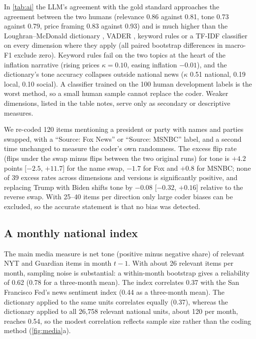 \documentclass[11pt]{article}
\begin{document}
In \cref{tab:ai} the LLM's agreement with the gold standard approaches the agreement between the two humans (relevance 0.86 against 0.81, tone 0.73 against 0.79, price framing 0.83 against 0.93) and is much higher than the Loughran–McDonald dictionary \citep{loughran2011}, VADER \citep{hutto2014}, keyword rules or a TF-IDF classifier on every dimension where they apply (all paired bootstrap differences in macro-F1 exclude zero). Keyword rules fail on the two topics at the heart of the inflation narrative (rising prices $\kappa = 0.10$, easing inflation $-0.01$), and the dictionary's tone accuracy collapses outside national news ($\kappa$ 0.51 national, 0.19 local, 0.10 social). A classifier trained on the 100 human development labels is the worst method, so a small human sample cannot replace the coder. Weaker dimensions, listed in the table notes, serve only as secondary or descriptive measures.



 We re-coded 120 items mentioning a president or party with names and parties swapped, with a ``Source: Fox News'' or ``Source: MSNBC'' label, and a second time unchanged to measure the coder's own randomness. The excess flip rate (flips under the swap minus flips between the two original runs) for tone is $+4.2$ points [$-2.5$, $+11.7$] for the name swap, $-1.7$ for Fox and $+0.8$ for MSNBC; none of 39 excess rates across dimensions and versions is significantly positive, and replacing Trump with Biden shifts tone by $-0.08$ [$-0.32$, $+0.16$] relative to the reverse swap. With 25–40 items per direction only large coder biases can be excluded, so the accurate statement is that no bias was detected.

\subsection{A monthly national index}
The main media measure is net tone (positive minus negative share) of relevant NYT and Guardian items in month $t-1$. With about 26 relevant items per month, sampling noise is substantial: a within-month bootstrap gives a reliability of 0.62 (0.78 for a three-month mean). The index correlates 0.37 with the San Francisco Fed's news sentiment index \citep{shapiro2022} (0.44 as a three-month mean). The dictionary applied to the same units correlates equally (0.37), whereas the dictionary applied to all 26,758 relevant national units, about 120 per month, reaches 0.54, so the modest correlation reflects sample size rather than the coding method (\cref{fig:media}a).
\end{document}
